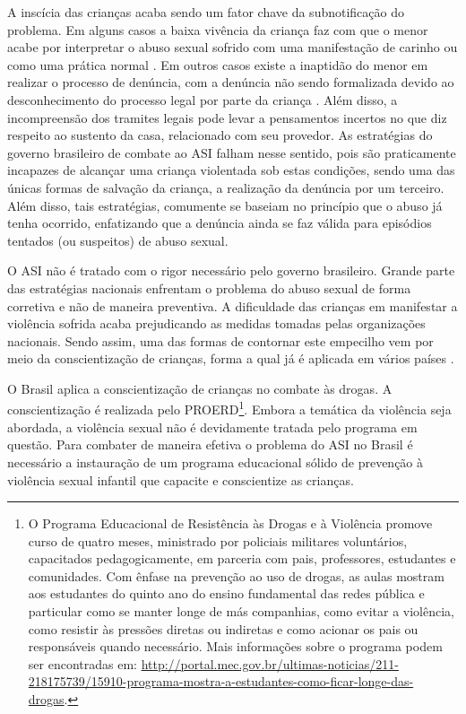 A inscícia das crianças acaba sendo um fator chave da subnotificação do problema. Em alguns casos a baixa vivência da criança faz com que o menor acabe por interpretar o abuso sexual sofrido com uma manifestação de carinho ou como uma prática normal \cite{aded2006abuso}. Em outros casos existe a inaptidão do menor em realizar o processo de denúncia, com a denúncia não sendo formalizada devido ao desconhecimento do processo legal por parte da criança \cite{OMS2002world}. Além disso, a incompreensão dos tramites legais pode levar a pensamentos incertos no que diz respeito ao sustento da casa, relacionado com seu provedor. As estratégias do governo brasileiro de combate ao \ac{ASI} falham nesse sentido, pois são praticamente incapazes de alcançar uma criança violentada sob estas condições, sendo uma das únicas formas de salvação da criança, a realização da denúncia por um terceiro. Além disso, tais estratégias, comumente se baseiam no princípio que o abuso já tenha ocorrido, enfatizando que a denúncia ainda se faz válida para episódios tentados (ou suspeitos) de abuso sexual.

O \ac{ASI} não é tratado com o rigor necessário pelo governo brasileiro. Grande parte das estratégias nacionais enfrentam o problema do abuso sexual de forma corretiva e não de maneira preventiva. A dificuldade das crianças em manifestar a violência sofrida acaba prejudicando as medidas tomadas pelas organizações nacionais. Sendo assim, uma das formas de contornar este empecilho vem por meio da conscientização de crianças, forma a qual já é aplicada em vários países \cite{plummer1999history, muller2014child}.

O Brasil aplica a conscientização de crianças no combate às drogas. A conscientização é realizada pelo \ac{PROERD}\footnote{O Programa Educacional de Resistência às Drogas e à Violência promove curso de quatro meses, ministrado por policiais militares voluntários, capacitados pedagogicamente, em parceria com pais, professores, estudantes e comunidades. Com ênfase na prevenção ao uso de drogas, as aulas mostram aos estudantes do quinto ano do ensino fundamental das redes pública e particular como se manter longe de más companhias, como evitar a violência, como resistir às pressões diretas ou indiretas e como acionar os pais ou responsáveis quando necessário. Mais informações sobre o programa podem ser encontradas em: \url{http://portal.mec.gov.br/ultimas-noticias/211-218175739/15910-programa-mostra-a-estudantes-como-ficar-longe-das-drogas}.}. Embora a temática da violência seja abordada, a violência sexual não é devidamente tratada pelo programa em questão. Para combater de maneira efetiva o problema do \ac{ASI} no Brasil é necessário a instauração de um programa educacional sólido de prevenção à violência sexual infantil que capacite e conscientize as crianças. 

